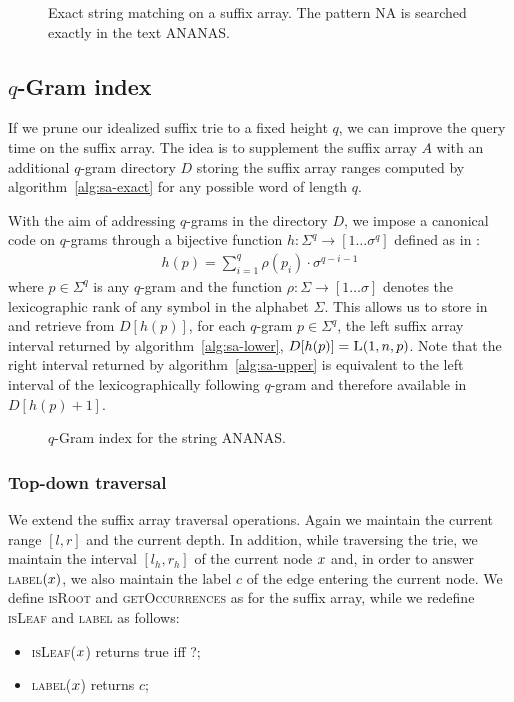 \begin{figure}[h]
\begin{center}
\caption[Exact string matching on a suffix array.]{Exact string matching on a suffix array. The pattern NA is searched exactly in the text ANANAS.}
\label{fig:sa-exact}
%
\end{center}
\end{figure}

\subsection{$q$-Gram index}

If we prune our idealized suffix trie to a fixed height $q$, we can improve the query time on the suffix array.
The idea is to supplement the suffix array $A$ with an additional $q$-gram directory $D$ storing the suffix array ranges computed by algorithm~\ref{alg:sa-exact} for any possible word of length $q$.

With the aim of addressing $q$-grams in the directory $D$, we impose a canonical code on $q$-grams through a bijective function $h : \Sigma^q \rightarrow [1 \dots \sigma^q]$ defined as in \citep{Knuth1973}:
\begin{eqnarray}
h(p) = \sum_{i=1}^{q}{\rho(p_i) \cdot \sigma^{q-i-1}}
\end{eqnarray}
where $p \in \Sigma^q$ is any $q$-gram and the function $\rho : \Sigma \rightarrow [1 \dots \sigma]$ denotes the lexicographic rank of any symbol in the alphabet $\Sigma$.
This allows us to store in and retrieve from $D[h(p)]$, for each $q$-gram $p \in \Sigma^q$, the left suffix array interval returned by algorithm~\ref{alg:sa-lower}, \ie $D[h(p)] = \textsc{L}(1,n,p)$.
Note that the right interval returned by algorithm~\ref{alg:sa-upper} is equivalent to the left interval of the lexicographically following $q$-gram and therefore available in $D[h(p)+1]$.

\begin{figure}[h]
\caption{$q$-Gram index for the string ANANAS.}
\label{fig:qgram}
\begin{center}
\end{center}
\end{figure}

\subsubsection{Top-down traversal}

We extend the suffix array traversal operations.
Again we maintain the current range $[l,r]$ and the current depth.
In addition, while traversing the trie, we maintain the interval $[l_h,r_h]$ of the current node $x$ and, in order to answer \textsc{label}$(x)$, we also maintain the label $c$ of the edge entering the current node.
We define \textsc{isRoot} and \textsc{getOccurrences} as for the suffix array, while we redefine \textsc{isLeaf} and \textsc{label} as follows:
\begin{itemize}
\item \textsc{isLeaf}($x$) returns true iff ?;
\item \textsc{label}($x$) returns $c$;
\end{itemize}

